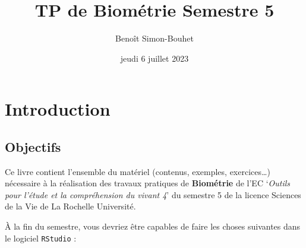 \documentclass[
  a4paper,
  DIV=11,
  numbers=noendperiod,
  oneside]{scrreprt}
\title{TP de Biométrie Semestre 5}
\author{Benoît Simon-Bouhet}
\date{jeudi 6 juillet 2023}
\renewcommand*\contentsname{Table des matières}
\newcommand\contentsname{Table des matières}
\begin{document}
\maketitle
\ifdefined\Shaded\renewenvironment{Shaded}{\begin{tcolorbox}[breakable, interior hidden, sharp corners, frame hidden, boxrule=0pt, enhanced, borderline west={3pt}{0pt}{shadecolor}]}{\end{tcolorbox}}\fi

\renewcommand*\contentsname{Table des matières}
{
\hypersetup{linkcolor=}
\setcounter{tocdepth}{2}
\tableofcontents
}

\hypertarget{introduction}{%
\chapter*{Introduction}\label{introduction}}


\hypertarget{objectifs}{%
\section*{Objectifs}\label{objectifs}}


Ce livre contient l'ensemble du matériel (contenus, exemples,
exercices\ldots) nécessaire à la réalisation des travaux pratiques de
\textbf{Biométrie} de l'EC `\emph{Outils pour l'étude et la
compréhension du vivant 4}' du semestre 5 de la licence Sciences de la
Vie de La Rochelle Université.

À la fin du semestre, vous devriez être capables de faire les choses
suivantes dans le logiciel \texttt{RStudio} :
\end{document}
